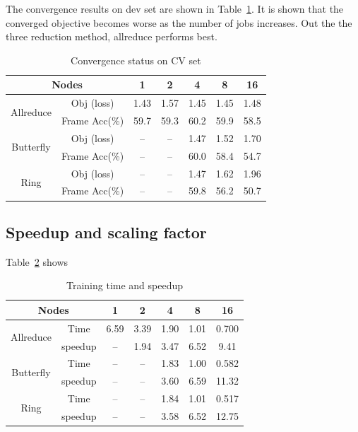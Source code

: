 \documentclass{article}
\begin{document}
The convergence results on dev set are shown in Table~\ref{tab:converge}. It is shown that 
the converged objective becomes worse as the number of jobs increases. Out the the three
reduction method, allreduce performs best.
\begin{table}
  \centering
  \begin{tabular}{c|c|c|c|c|c|c}
    \hline
           \multicolumn{2}{c|}{Nodes}         & 1    & 2    & 4    & 8    & 16 \\
    \hline
\multirow{2}{*}{Allreduce} &    Obj (loss)    & 1.43 & 1.57 & 1.45 & 1.45 & 1.48\\
                           &    Frame Acc(\%) & 59.7 & 59.3 & 60.2 & 59.9 & 58.5\\
    \hline
\multirow{2}{*}{Butterfly} &    Obj (loss)    & --   & --   & 1.47 & 1.52 & 1.70\\
                           &    Frame Acc(\%) & --   & --   & 60.0 & 58.4 & 54.7 \\
    \hline
\multirow{2}{*}{Ring}      &    Obj (loss)    & --   & --   & 1.47 & 1.62 & 1.96\\
                           &    Frame Acc(\%) & --   & --   & 59.8 & 56.2 & 50.7 \\
    \hline
  \end{tabular}
  \caption{Convergence status on CV set}
  \label{tab:converge}
\end{table}

\subsection{Speedup and scaling factor}
Table~\ref{tab:speedup} shows

\begin{table}
  \centering
  \begin{tabular}{c|c|c|c|c|c|c}
    \hline
           \multicolumn{2}{c|}{Nodes}   & 1    & 2    & 4    & 8    & 16 \\
    \hline
\multirow{2}{*}{Allreduce} &    Time    & 6.59 & 3.39 & 1.90 & 1.01 & 0.700\\
                           &    speedup & --   & 1.94 & 3.47 & 6.52 & 9.41 \\
    \hline
\multirow{2}{*}{Butterfly} &    Time    & --   & --   & 1.83 & 1.00 & 0.582\\
                           &    speedup & --   & --   & 3.60 & 6.59 & 11.32\\
    \hline
\multirow{2}{*}{Ring}      &    Time    & --   & --   & 1.84 & 1.01 & 0.517\\
                           &    speedup & --   & --   & 3.58 & 6.52 & 12.75\\
    \hline
  \end{tabular}
  \caption{Training time and speedup}
  \label{tab:speedup}
\end{table}
\end{document}
